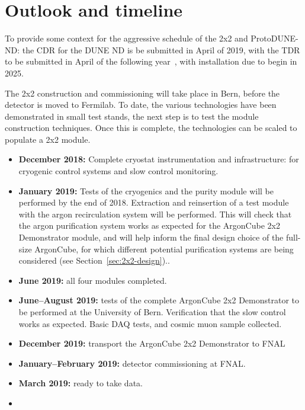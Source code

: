 \section{Outlook and timeline}
\label{sec:outlook}
To provide some context for the aggressive schedule of the 2x2 and ProtoDUNE-ND: the CDR for the DUNE ND is be submitted in April of 2019, with the TDR to be submitted in April of the following year~\cite{dune_dates}, with installation due to begin in 2025. 

The 2x2 construction and commissioning will take place in Bern, before the detector is moved to Fermilab. To date, the various technologies have been demonstrated in small test stands, the next step is to test the module construction techniques. Once this is complete, the technologies can be scaled to populate a 2x2 module.      

\begin{itemize}
\item {\bf December 2018:} Complete cryostat instrumentation and infrastructure: for cryogenic control systems and slow control monitoring. 
\item {\bf January 2019:} Tests of the cryogenics and the purity module will be performed by the end of 2018. Extraction and reinsertion of a test module  with the argon recirculation system will be performed. This will check that the argon purification system works as expected for the ArgonCube 2x2 Demonstrator module, and will help inform the final design choice of the full-size ArgonCube, for which different potential purification systems are being considered (see Section~\ref{sec:2x2-design})..
\item {\bf June 2019:} all four modules completed.
\item {\bf June--August 2019:} tests of the complete ArgonCube 2x2 Demonstrator to be performed at the University of Bern. Verification that the slow control works as expected. Basic DAQ tests, and cosmic muon sample collected.
\item {\bf December 2019:} transport the ArgonCube 2x2 Demonstrator to FNAL
\item {\bf January--February 2019:} detector commissioning at FNAL.
\item {\bf March 2019:} ready to take data.
\item {}
\end{itemize}
